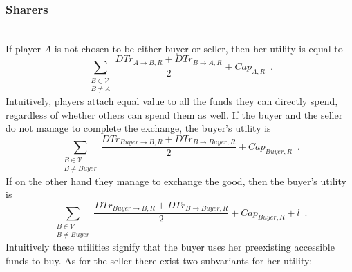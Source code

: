   \subsubsection{Sharers} \ \\

    If player $A$ is not chosen to be either buyer or seller, then her utility is equal to 
    \begin{equation*}
      \sum\limits_{\substack{B \in \mathcal{V} \\ B \neq A}}\frac{DTr_{A \rightarrow B, R} + DTr_{B \rightarrow A, R}}{2} +
      Cap_{A, R} \enspace.
    \end{equation*}
    Intuitively, players attach equal value to all the funds they can directly spend, regardless of whether others can spend
    them as well. If the buyer and the seller do not manage to complete the exchange, the buyer's utility is
    \begin{equation*}
      \sum\limits_{\substack{B \in \mathcal{V} \\ B \neq Buyer}}\frac{DTr_{Buyer \rightarrow B, R} + DTr_{B \rightarrow Buyer,
      R}}{2} + Cap_{Buyer, R} \enspace.
    \end{equation*}
    If on the other hand they manage to exchange the good, then the buyer's utility is 
    \begin{equation*}
      \sum\limits_{\substack{B \in \mathcal{V} \\ B \neq Buyer}}\frac{DTr_{Buyer \rightarrow B, R} + DTr_{B \rightarrow Buyer,
      R}}{2} + Cap_{Buyer, R} + l \enspace.
    \end{equation*}
    Intuitively these utilities signify that the buyer uses her preexisting accessible funds to buy. As for the seller there
    exist two subvariants for her utility:
